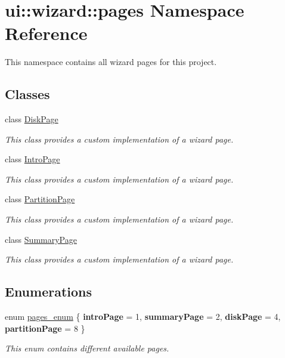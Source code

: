 \hypertarget{namespaceui_1_1wizard_1_1pages}{}\section{ui\+:\+:wizard\+:\+:pages Namespace Reference}
\label{namespaceui_1_1wizard_1_1pages}


This namespace contains all wizard pages for this project.  


\subsection*{Classes}
\begin{DoxyCompactItemize}
\item 
class \mbox{\hyperlink{classui_1_1wizard_1_1pages_1_1_disk_page}{Disk\+Page}}
\begin{DoxyCompactList}\small\item\em This class provides a custom implementation of a wizard page. \end{DoxyCompactList}\item 
class \mbox{\hyperlink{classui_1_1wizard_1_1pages_1_1_intro_page}{Intro\+Page}}
\begin{DoxyCompactList}\small\item\em This class provides a custom implementation of a wizard page. \end{DoxyCompactList}\item 
class \mbox{\hyperlink{classui_1_1wizard_1_1pages_1_1_partition_page}{Partition\+Page}}
\begin{DoxyCompactList}\small\item\em This class provides a custom implementation of a wizard page. \end{DoxyCompactList}\item 
class \mbox{\hyperlink{classui_1_1wizard_1_1pages_1_1_summary_page}{Summary\+Page}}
\begin{DoxyCompactList}\small\item\em This class provides a custom implementation of a wizard page. \end{DoxyCompactList}\end{DoxyCompactItemize}
\subsection*{Enumerations}
\begin{DoxyCompactItemize}
\item 
enum \mbox{\hyperlink{namespaceui_1_1wizard_1_1pages_a1a25c157e498474f0cf868944a52bf44}{pages\+\_\+enum}} \{ {\bfseries intro\+Page} = 1, 
{\bfseries summary\+Page} = 2, 
{\bfseries disk\+Page} = 4, 
{\bfseries partition\+Page} = 8
 \}
\begin{DoxyCompactList}\small\item\em This enum contains different available pages. \end{DoxyCompactList}\end{DoxyCompactItemize}


